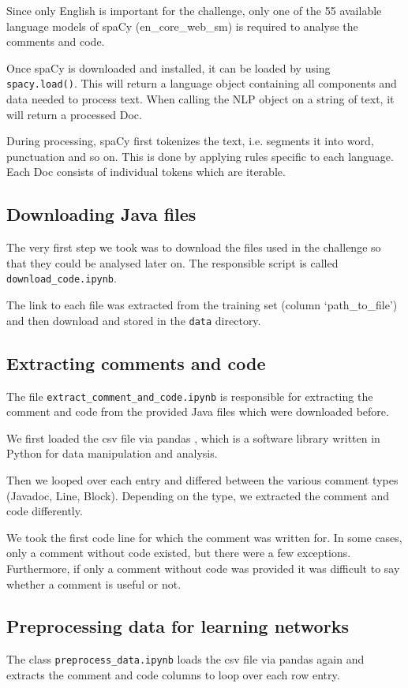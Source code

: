 \documentclass[runningheads]{llncs}
\begin{document}
Since only English is important for the challenge, only one of the 55 available language models of spaCy (en\_core\_web\_sm) is required to analyse the comments and code.

Once spaCy is downloaded and installed, it can be loaded by using \texttt{spacy.load()}. This will return a language object containing all components and data needed to process text.
When calling the NLP object on a string of text, it will return a processed Doc.

During processing, spaCy first tokenizes the text, i.e. segments it into word, punctuation and so on. This is done by applying rules specific to each language. Each Doc consists of individual tokens which are iterable.

\subsection{Downloading Java files}
The very first step we took was to download the files used in the challenge so that they could be analysed later on. The responsible script is called \texttt{download\_code.ipynb}.

The link to each file was extracted from the training set (column `path\_to\_file') and then download and stored in the \texttt{data} directory.

\subsection{Extracting comments and code}
The file \texttt{extract\_comment\_and\_code.ipynb} is responsible for extracting the comment and code from the provided Java files which were downloaded before.

We first loaded the csv file via pandas \cite{ref_pandas}, which is a software library written in Python for data manipulation and analysis.

Then we looped over each entry and differed between the various comment types (Javadoc, Line, Block). Depending on the type, we extracted the comment and code differently.

We took the first code line for which the comment was written for. In some cases, only a comment without code existed, but there were a few exceptions. Furthermore, if only a comment without code was provided it was difficult to say whether a comment is useful or not.

\subsection{Preprocessing data for learning networks}
The class \texttt{preprocess\_data.ipynb} loads the csv file via pandas again and extracts the comment and code columns to loop over each row entry.
\end{document}
